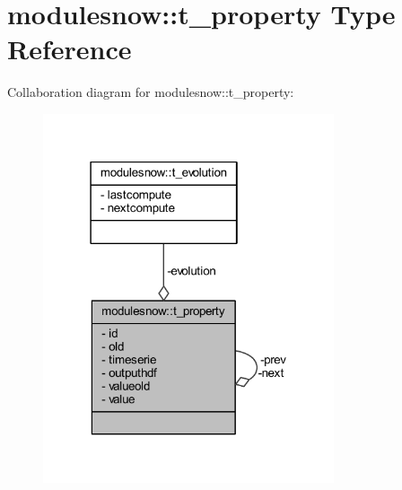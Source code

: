 \hypertarget{structmodulesnow_1_1t__property}{}\section{modulesnow\+:\+:t\+\_\+property Type Reference}
\label{structmodulesnow_1_1t__property}


Collaboration diagram for modulesnow\+:\+:t\+\_\+property\+:\nopagebreak
\begin{figure}[H]
\begin{center}
\leavevmode
\includegraphics[width=243pt]{structmodulesnow_1_1t__property__coll__graph}
\end{center}
\end{figure}

